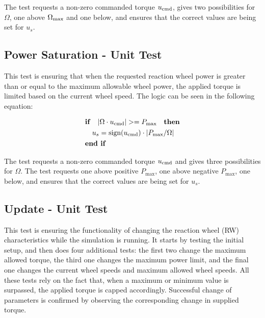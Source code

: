 The test requests a non-zero commanded torque $u_{\textnormal{cmd}}$, gives two possibilities for $\Omega$, one above $\Omega_{\textnormal{max}}$ and one below, and ensures that the correct values are being set for $u_s$.

\subsection{Power Saturation - Unit Test}

This test is ensuring that when the requested reaction wheel power is greater than or equal to the maximum allowable wheel power, the applied torque is limited based on the current wheel speed. The logic can be seen in the following equation:

\begin{equation}
\begin{gathered}
\begin{aligned}
&\textnormal{\textbf{if}}\quad \vert \Omega \cdot u_{\textnormal{cmd}} \vert >= P_{\text{max}} \textnormal \quad \textnormal{\textbf{then}}\\
&\quad u_s = \textnormal{sign}(u_{\textnormal{cmd}})\cdot \vert P_{\text{max}}/\Omega \vert \\
&\textnormal{\textbf{end if}}\\
\end{aligned}
\end{gathered}
\label{eq:ballin3}
\end{equation}

The test requests a non-zero commanded torque $u_{\textnormal{cmd}}$ and gives three possibilities for $\Omega$. The test requests one above positive $P_{\text{max}}$, one above negative $P_{\text{max}}$, one below, and ensures that the correct values are being set for $u_s$.

\subsection{Update - Unit Test}

This test is ensuring the functionality of changing the reaction wheel (RW) characteristics while the simulation is running. It starts by testing the initial setup, and then does four additional tests: the first two change the maximum allowed torque, the third one changes the maximum power limit, and the final one changes the current wheel speeds and maximum allowed wheel speeds.
All these tests rely on the fact that, when a maximum or minimum value is surpassed, the applied torque is capped accordingly. Successful change of parameters is confirmed by observing the corresponding change in supplied torque.

